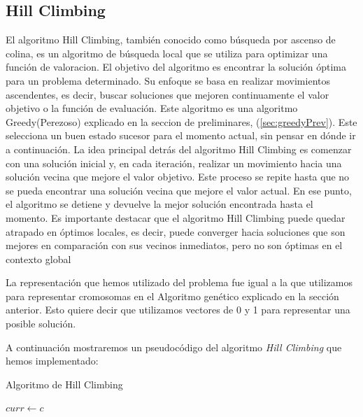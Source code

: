 \subsection{Hill Climbing}
\label{alg:approachHC}
El algoritmo Hill Climbing, también conocido como búsqueda por ascenso de colina\cite{Russell:2009}, es un algoritmo de búsqueda local que se utiliza para optimizar una función de valoracion. El objetivo del algoritmo es encontrar la solución óptima para un problema determinado.  Su enfoque se basa en realizar movimientos ascendentes, es decir, buscar soluciones que mejoren continuamente el valor objetivo o la función de evaluación.
Este algoritmo es una algoritmo Greedy(Perezoso) explicado en la seccion de preliminares, (\ref{sec:greedyPrev}). Este selecciona un buen estado sucesor para el momento actual, sin pensar en dónde ir a continuación. 
La idea principal detrás del algoritmo Hill Climbing es comenzar con una solución inicial y, en cada iteración, realizar un movimiento hacia una solución vecina que mejore el valor objetivo. Este proceso se repite hasta que no se pueda encontrar una solución vecina que mejore el valor actual. En ese punto, el algoritmo se detiene y devuelve la mejor solución encontrada hasta el momento.
Es importante destacar que el algoritmo Hill Climbing puede quedar atrapado en óptimos locales, es decir, puede converger hacia soluciones que son mejores en comparación con sus vecinos inmediatos, pero no son óptimas en el contexto global

La representación que hemos utilizado del problema fue igual a la que utilizamos para representar cromosomas en el Algoritmo genético explicado en la sección anterior. Esto quiere decir que utilizamos vectores de 0 y 1 para representar una posible solución. 

A continuación mostraremos un pseudocódigo del algoritmo \emph{Hill Climbing} que hemos implementado:

\begin{algorithm}[H]
  \caption{Algoritmo de Hill Climbing}
  \label{algo:hill_climbing}
  \SetAlgoLined
  $curr \gets c$\; 
  
  \;
\end{algorithm}

